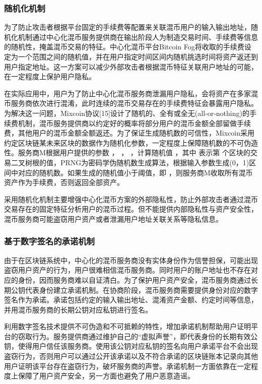 \subsubsection{随机化机制}

为了防止攻击者根据平台固定的手续费等配置来关联混币用户的输入输出地址，随机化机制通过中心化混币服务提供商在输出阶段人为制造交易时间、手续费等信息的随机性，掩盖混币交易的特征。中心化混币平台Bitcoin Fog将收取的手续费设定为一个范围之间的随机值，并在用户指定时间区间内随机挑选时间将资产返还到用户指定地址。这一方案可以减少外部攻击者根据混币特征关联用户地址的可能，在一定程度上保护用户隐私。

在实际应用中，用户为了防止中心化混币服务商泄漏用户隐私，会将资产在多家混币服务商依次进行混淆，此时连续的混币交易存在的手续费特征会暴露用户隐私。为解决这一问题，Mixcoin协议[15]设计了随机的、全有或全无(all-or-nothing)的手续费机制，混币服务提供商以约定好的概率将部分用户的混币金额全部留做手续费，其他用户的混币金额全额返还。为了保证生成随机数的可信性，Mixcoin采用约定区块链某未来区块的数据作为随机化参数，一定程度上保障随机数的不可伪造性。服务商M根据用户提供的参数 ， ， ，计算随机值 ，其中 表示第 个区块的交易二叉树根的值，PRNG为密码学伪随机数生成算法，根据输入参数生成(0，1)区间中对应的随机数。如果生成的随机值小于阈值，即 ，则服务商M收取所有混币资产作为手续费，否则返回全部资产。

采用随机化机制主要增强中心化混币方案的外部隐私性，防止外部攻击者通过混币交易存在的固定特征分析用户的混币过程。但不能提供内部隐私性与资产安全性，混币服务商可能盗窃用户资产或者泄漏用户地址关联关系等隐私信息。

\subsubsection{基于数字签名的承诺机制}

由于在区块链系统中，中心化的混币服务商没有实体身份作为信誉担保，可能出现盗窃用户资产的行为，用户很难相信混币服务商。同时用户的账户地址也不存在对应的身份，因而服务商难以自证清白。为了保护用户资产安全，混币服务商通过长期公钥代表身份建立承诺机制。在协商阶段，混币服务商需要提供身份对应的数字签名作为承诺。承诺包括约定的输入输出地址、混淆资产金额、约定时间等信息，并用混币服务商的长期公钥对应私钥进行签名。
	
利用数字签名技术提供不可伪造和不可抵赖的特性，增加承诺机制帮助用户证明平台的窃取行为。服务提供商通过维护自己的“虚拟声誉”，即代表身份的长期有效公钥，使得用户信任该服务商。使用该公钥对应私钥的签名向用户承诺平台不会出现盗窃行为，否则用户可以通过公开该承诺以及不符合承诺的区块链账本记录向其他用户证明该平台存在盗窃行为，破坏服务商的声誉。承诺机制一方面依靠在一定程度上保障了用户资产安全，另一方面也避免了用户恶意造谣。

